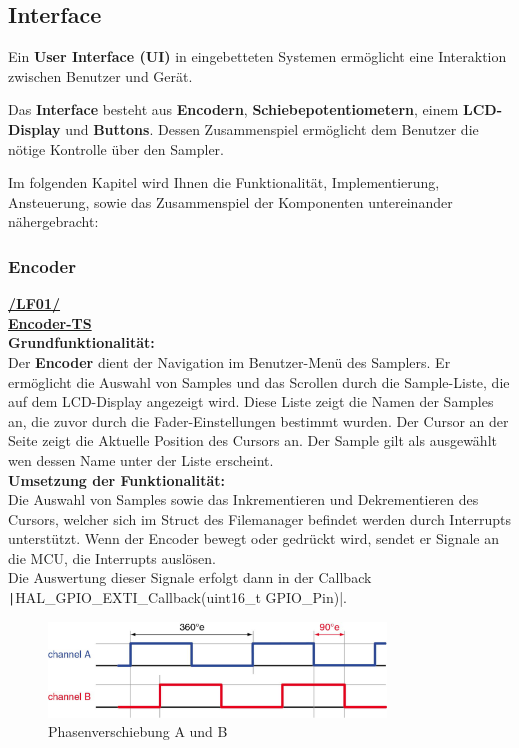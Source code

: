 \subsection{Interface}

Ein\textbf{ User Interface (UI)} in eingebetteten Systemen ermöglicht eine Interaktion zwischen Benutzer und Gerät.

Das \textbf{Interface} besteht aus \textbf{Encodern}, \textbf{Schiebepotentiometern}, einem \textbf{LCD-Display }und \textbf{Buttons}. Dessen Zusammenspiel ermöglicht dem Benutzer die nötige Kontrolle über den Sampler.


Im folgenden Kapitel wird Ihnen die Funktionalität, Implementierung, Ansteuerung, sowie das Zusammenspiel der Komponenten untereinander nähergebracht: 

\subsubsection{Encoder}
\textbf{\hyperlink{LF01_Link}{/LF01/}} \\
\textbf{\hyperlink{Encoder}{Encoder-TS}} \\
\textbf{Grundfunktionalität:} \\


Der \textbf{Encoder} dient der Navigation im Benutzer-Menü des Samplers. Er ermöglicht die Auswahl von Samples und das Scrollen durch die Sample-Liste, die auf dem LCD-Display angezeigt wird. Diese Liste zeigt die Namen der Samples an, die zuvor durch die Fader-Einstellungen bestimmt wurden. Der Cursor an der Seite zeigt die Aktuelle Position des Cursors an. Der Sample gilt als ausgewählt wen dessen Name unter der Liste erscheint.\\

\textbf{Umsetzung der Funktionalität:} \\

Die Auswahl von Samples sowie das Inkrementieren und Dekrementieren des Cursors, welcher sich im Struct des Filemanager befindet werden durch Interrupts unterstützt. Wenn der Encoder bewegt oder gedrückt wird, sendet er Signale an die MCU, die Interrupts auslösen.\\

Die Auswertung dieser Signale erfolgt dann in der Callback  \texttt|HAL_GPIO_EXTI_Callback(uint16_t GPIO_Pin)|. 

\begin{figure}[H]
	\centering
	\includegraphics[width=0.8\textwidth]{images/08_durchfuehrung/interface/encoder.png}
	\caption{Phasenverschiebung A und B}
	\label{fig:phase_verschiebung}
\end{figure}


